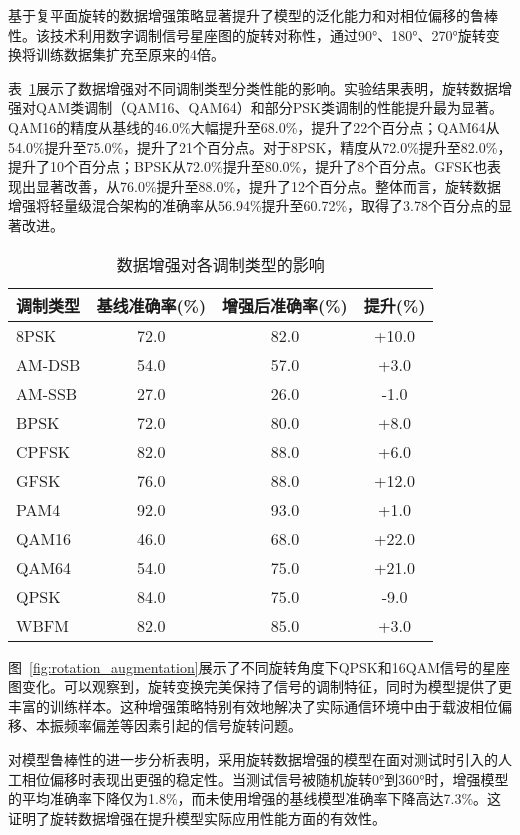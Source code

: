 \documentclass[conference]{IEEEtran}
\begin{document}
基于复平面旋转的数据增强策略显著提升了模型的泛化能力和对相位偏移的鲁棒性。该技术利用数字调制信号星座图的旋转对称性，通过90°、180°、270°旋转变换将训练数据集扩充至原来的4倍。

表~\ref{tab:data_augmentation_results}展示了数据增强对不同调制类型分类性能的影响。实验结果表明，旋转数据增强对QAM类调制（QAM16、QAM64）和部分PSK类调制的性能提升最为显著。QAM16的精度从基线的46.0\%大幅提升至68.0\%，提升了22个百分点；QAM64从54.0\%提升至75.0\%，提升了21个百分点。对于8PSK，精度从72.0\%提升至82.0\%，提升了10个百分点；BPSK从72.0\%提升至80.0\%，提升了8个百分点。GFSK也表现出显著改善，从76.0\%提升至88.0\%，提升了12个百分点。整体而言，旋转数据增强将轻量级混合架构的准确率从56.94\%提升至60.72\%，取得了3.78个百分点的显著改进。

\begin{table}[h]
\centering
\caption{数据增强对各调制类型的影响}
\label{tab:data_augmentation_results}
\begin{tabular}{@{}lccc@{}}
\toprule
调制类型 & 基线准确率(\%) & 增强后准确率(\%) & 提升(\%) \\
\midrule
8PSK     & 72.0  & 82.0  & +10.0 \\
AM-DSB   & 54.0  & 57.0  & +3.0  \\
AM-SSB   & 27.0  & 26.0  & -1.0  \\
BPSK     & 72.0  & 80.0  & +8.0  \\
CPFSK    & 82.0  & 88.0  & +6.0  \\
GFSK     & 76.0  & 88.0  & +12.0 \\
PAM4     & 92.0  & 93.0  & +1.0  \\
QAM16    & 46.0  & 68.0  & +22.0 \\
QAM64    & 54.0  & 75.0  & +21.0 \\
QPSK     & 84.0  & 75.0  & -9.0  \\
WBFM     & 82.0  & 85.0  & +3.0  \\
\bottomrule
\end{tabular}
\end{table}

图~\ref{fig:rotation_augmentation}展示了不同旋转角度下QPSK和16QAM信号的星座图变化。可以观察到，旋转变换完美保持了信号的调制特征，同时为模型提供了更丰富的训练样本。这种增强策略特别有效地解决了实际通信环境中由于载波相位偏移、本振频率偏差等因素引起的信号旋转问题。

对模型鲁棒性的进一步分析表明，采用旋转数据增强的模型在面对测试时引入的人工相位偏移时表现出更强的稳定性。当测试信号被随机旋转0°到360°时，增强模型的平均准确率下降仅为1.8\%，而未使用增强的基线模型准确率下降高达7.3\%。这证明了旋转数据增强在提升模型实际应用性能方面的有效性。
\end{document}
